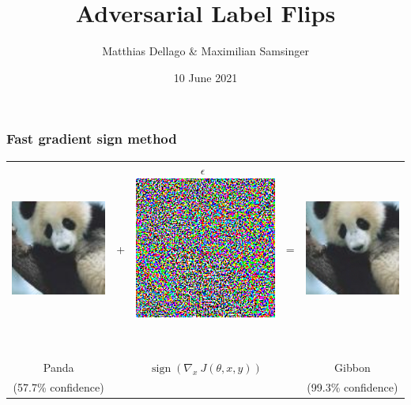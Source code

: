 \documentclass[10pt,usepdftitle=false,aspectratio=169]{beamer}
\title{Adversarial Label Flips}
\author{Matthias Dellago \& Maximilian Samsinger}
\date{10 June 2021}
\begin{document}
\DeclarePairedDelimiter\abs{\lvert}{\rvert}%
\DeclarePairedDelimiter\norm{\lVert}{\rVert}%
\DeclarePairedDelimiter\ceil{\lceil}{\rceil}
\DeclarePairedDelimiter\floor{\lfloor}{\rfloor}

\begin{frame}[plain]
	\maketitle
\end{frame}	


\begin{frame}
	\frametitle{Fast gradient sign method}
	\begin{tabular}{ccccc}
		\includegraphics[align=c,width=0.28\columnwidth]{plots/panda_577.png} & \Huge{+} & \Huge{\textbf{$\epsilon$}}\ \includegraphics[align=c,width=0.28\columnwidth]{plots/nematode_082.png}\ & \Huge{=} & \includegraphics[align=c,width=0.28\columnwidth]{plots/gibbon_993.png} \\~\\
		\huge{Panda} &&\qquad \large{$\operatorname{sign}(\nabla_x\ J(\theta,x,y))$}&& \huge{Gibbon} \\
		(57.7\% confidence) &&&& (99.3\% confidence) 
	\end{tabular}
\end{frame}
\end{document}
